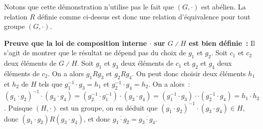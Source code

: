 \noindent
Notons que cette démonstration n'utilise pas le fait que $(G, \cdot)$ est abélien.
La relation $R$ définie comme ci-dessus est donc une relation d'équivalence pour tout groupe $(G, \cdot)$.

\medskip

\noindent\textbf{Preuve que la loi de composition interne $\cdot$ sur $G \divslash H$ est bien définie :} Il s'agit de montrer que le résultat ne dépend pas du choix de $g_1$ et $g_2$.
    Soit $c_1$ et $c_2$ deux éléments de $G \divslash H$. 
    Soit $g_1$ et $g_3$ deux éléments de $c_1$ et $g_2$ et $g_4$ deux éléments de $c_2$.
    On a alors $g_1 R g_3$ et $g_2 R g_4$.
    On peut donc choisir deux éléments $h_1$ et $h_2$ de $H$ tels que $g_1^{-1} \cdot g_3 = h_1$ et $g_2^{-1} \cdot g_4 = h_2$.
    On a alors : $(g_1 \cdot g_2)^{-1} \cdot (g_3 \cdot g_4) = (g_2^{-1} \cdot g_1^{-1}) \cdot (g_3 \cdot g_4) = (g_1^{-1} \cdot g_3) \cdot \cdot (g_2^{-1} \cdot g_4) = h_1 \cdot h_2$. 
    Puisque $(H, \cdot)$ est un groupe, on en déduit que $(g_1 \cdot g_2)^{-1} \cdot (g_3 \cdot g_4) \in H$, donc $(g_1 \cdot g_2) R (g_3 \cdot g_4)$, et donc $\overline{g_1 \cdot g_2} = \overline{g_3 \cdot g_4}$.

\done

\medskip

